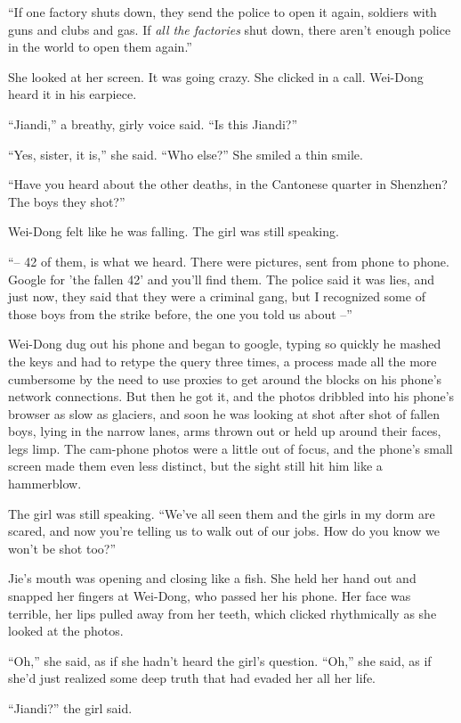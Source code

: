 ``If one factory shuts down, they send the police to open it again,
soldiers with guns and clubs and gas. If \emph{all the factories}
shut down, there aren't enough police in the world to open them
again.''

She looked at her screen. It was going crazy. She clicked in a
call. Wei-Dong heard it in his earpiece.

``Jiandi,'' a breathy, girly voice said. ``Is this Jiandi?''

``Yes, sister, it is,'' she said. ``Who else?'' She smiled a thin
smile.

``Have you heard about the other deaths, in the Cantonese quarter in
Shenzhen? The boys they shot?''

Wei-Dong felt like he was falling. The girl was still speaking.

``-- 42 of them, is what we heard. There were pictures, sent from
phone to phone. Google for 'the fallen 42' and you'll find them.
The police said it was lies, and just now, they said that they were
a criminal gang, but I recognized some of those boys from the
strike before, the one you told us about --''

Wei-Dong dug out his phone and began to google, typing so quickly
he mashed the keys and had to retype the query three times, a
process made all the more cumbersome by the need to use proxies to
get around the blocks on his phone's network connections. But then
he got it, and the photos dribbled into his phone's browser as slow
as glaciers, and soon he was looking at shot after shot of fallen
boys, lying in the narrow lanes, arms thrown out or held up around
their faces, legs limp. The cam-phone photos were a little out of
focus, and the phone's small screen made them even less distinct,
but the sight still hit him like a hammerblow.

The girl was still speaking. ``We've all seen them and the girls in
my dorm are scared, and now you're telling us to walk out of our
jobs. How do you know we won't be shot too?''

Jie's mouth was opening and closing like a fish. She held her hand
out and snapped her fingers at Wei-Dong, who passed her his phone.
Her face was terrible, her lips pulled away from her teeth, which
clicked rhythmically as she looked at the photos.

``Oh,'' she said, as if she hadn't heard the girl's question. ``Oh,''
she said, as if she'd just realized some deep truth that had evaded
her all her life.

``Jiandi?'' the girl said.

